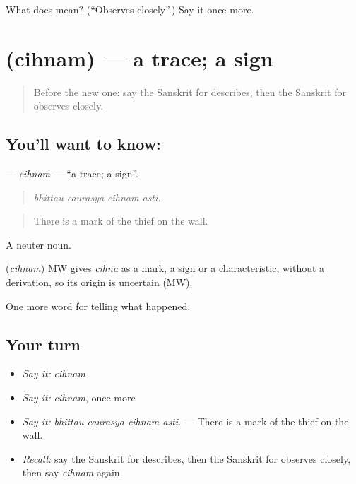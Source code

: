 \begin{tcolorbox}[breakable,colback=teal!4,colframe=teal!35!black,title={Before you move on}]
What does  mean? (\textquotedblleft{}Observes closely\textquotedblright{}.) Say it once more.
\end{tcolorbox}
\section[\texorpdfstring{\sk{चिह्नम्} (cihnam)}{चिह्नम् (cihnam)}]{ (cihnam) — a trace; a sign}

\label{lesson:SA-C289-cihnam}



\begin{quote}
Before the new one: say the Sanskrit for describes, then the Sanskrit for observes closely.
\end{quote}

\subsection*{You'll want to know: }
\textbf{} — \emph{cihnam} — \textquotedblleft{}a trace; a sign\textquotedblright{}.

\begin{quote}
   
\end{quote}

\begin{quote}
\emph{bhittau caurasya cihnam asti.}
\end{quote}

\begin{quote}
There is a mark of the thief on the wall.
\end{quote}

A neuter noun.

\begin{cousinweb}
\textbf{} (\emph{cihnam}) MW gives \emph{cihna} as a mark, a sign or a characteristic, without a derivation, so its origin is uncertain (MW).
\end{cousinweb}

\begin{grammarlens}[title={What you've built}]
One more word for telling what happened.
\end{grammarlens}

\subsection*{Your turn}
\begin{itemize}
\raggedright
  \item \emph{Say it:} \emph{cihnam}
  \item \emph{Say it:} \emph{cihnam}, once more
  \item \emph{Say it:} \emph{bhittau caurasya cihnam asti.} — There is a mark of the thief on the wall.
  \item \emph{Recall:} say the Sanskrit for describes, then the Sanskrit for observes closely, then say \emph{cihnam} again
\end{itemize}

